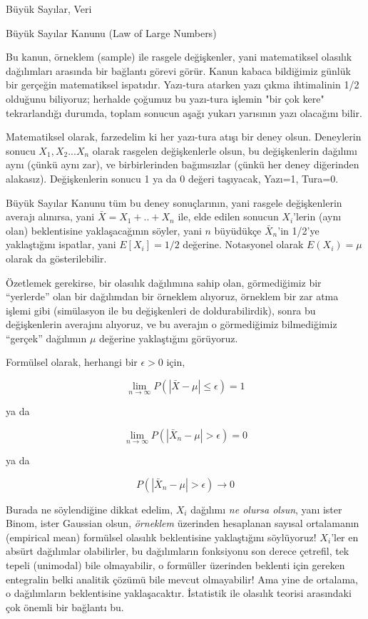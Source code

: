 \documentclass[12pt,fleqn]{article}\usepackage{../../common}
\begin{document}
Büyük Sayılar, Veri

Büyük Sayılar Kanunu (Law of Large Numbers)

Bu kanun, örneklem (sample) ile rasgele değişkenler, yani matematiksel
olasılık dağılımları arasında bir bağlantı görevi görür. Kanun kabaca
bildiğimiz günlük bir gerçeğin matematiksel ispatıdır. Yazı-tura atarken
yazı çıkma ihtimalinin 1/2 olduğunu biliyoruz; herhalde çoğumuz bu
yazı-tura işlemin "bir çok kere" tekrarlandığı durumda, toplam sonucun
aşağı yukarı yarısının yazı olacağını bilir.

Matematiksel olarak, farzedelim ki her yazı-tura atışı bir deney
olsun. Deneylerin sonucu $X_1, X_2...X_n$ olarak rasgelen değişkenlerle
olsun, bu değişkenlerin dağılımı aynı (çünkü aynı zar), ve birbirlerinden
bağımsızlar (çünkü her deney diğerinden alakasız). Değişkenlerin sonucu 1
ya da 0 değeri taşıyacak, Yazı=1, Tura=0.

Büyük Sayılar Kanunu tüm bu deney sonuçlarının, yani rasgele değişkenlerin
averajı alınırsa, yani $\bar{X} = X_1 + .. + X_n$ ile, elde edilen sonucun
$X_i$'lerin (aynı olan) beklentisine yaklaşacağının söyler, yani $n$ büyüdükçe
$\bar{X}_n$'in 1/2'ye yaklaştığını ispatlar, yani $E[X_i] = 1/2$
değerine. Notasyonel olarak $E(X_i) = \mu$ olarak da gösterilebilir.

Özetlemek gerekirse, bir olasılık dağılımına sahip olan, görmediğimiz bir
``yerlerde'' olan bir dağılımdan bir örneklem alıyoruz, örneklem bir zar
atma işlemi gibi (simülasyon ile bu değişkenleri de doldurabilirdik), sonra
bu değişkenlerin averajını alıyoruz, ve bu averajın o görmediğimiz
bilmediğimiz ``gerçek'' dağılımın $\mu$ değerine yaklaştığını görüyoruz. 

Formülsel olarak, herhangi bir $\epsilon > 0$ için,

$$ \lim_{n \to \infty} P(|\bar{X} - \mu| \le \epsilon) = 1$$

ya da

 $$ \lim_{n \to \infty} P(|\bar{X}_n-\mu| > \epsilon) = 0 $$

ya da 

$$ P(|\bar{X}_n-\mu| > \epsilon) \rightarrow 0 $$

Burada ne söylendiğine dikkat edelim, $X_i$ dağılımı {\em ne olursa olsun}, yanı
ister Binom, ister Gaussian olsun, {\em örneklem} üzerinden hesaplanan sayısal
ortalamanın (empirical mean) formülsel olasılık beklentisine yaklaştığını
söylüyoruz! $X_i$'ler en absürt dağılımlar olabilirler, bu dağılımların
fonksiyonu son derece çetrefil, tek tepeli (unimodal) bile olmayabilir, o
formüller üzerinden beklenti için gereken entegralin belki analitik çözümü bile
mevcut olmayabilir! Ama yine de ortalama, o dağılımların beklentisine
yaklaşacaktır.  İstatistik ile olasılık teorisi arasındaki çok önemli bir
bağlantı bu.
\end{document}
